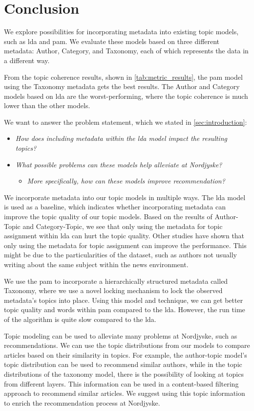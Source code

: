 \section{Conclusion}\label{sec:conclusion}
We explore possibilities for incorporating metadata into existing topic models, such as \gls{lda} and \gls{pam}.
We evaluate these models based on three different metadata: Author, Category, and Taxonomy, each of which represents the data in a different way.

From the topic coherence results, shown in \autoref{tab:metric_results}, the \gls{pam} model using the Taxonomy metadata gets the best results.
The Author and Category models based on \gls{lda} are the worst-performing, where the topic coherence is much lower than the other models.

We want to answer the problem statement, which we stated in \autoref{sec:introduction}:


\begin{itemize}
	\item \textit{How does including metadata within the \gls{lda} model impact the resulting topics?}
	\item \textit{What possible problems can these models help alleviate at Nordjyske?}
	\begin{itemize}
		\item \textit{More specifically, how can these models improve recommendation?}
	\end{itemize}
\end{itemize}

We incorporate metadata into our topic models in multiple ways.
The \gls{lda} model is used as a baseline, which indicates whether incorporating metadata can improve the topic quality of our topic models.
Based on the results of Author-Topic and Category-Topic, we see that only using the metadata for topic assignment within \gls{lda} can hurt the topic quality.
Other studies have shown that only using the metadata for topic assignment can improve the performance.
This might be due to the particularities of the dataset, such as authors not usually writing about the same subject within the news environment.  


We use the \gls{pam} to incorporate a hierarchically structured metadata called Taxonomy, where we use a novel locking mechanism to lock the observed metadata's topics into place.
Using this model and technique, we can get better topic quality and words within \gls{pam} compared to the \gls{lda}.
However, the run time of the algorithm is quite slow compared to the \gls{lda}.


Topic modeling can be used to alleviate many problems at Nordjyske, such as recommendations.
We can use the topic distributions from our models to compare articles based on their similarity in topics.
For example, the author-topic model's topic distribution can be used to recommend similar authors, while in the topic distributions of the taxonomy model, there is the possibility of looking at topics from different layers.
This information can be used in a content-based filtering approach to recommend similar articles.
We suggest using this topic information to enrich the recommendation process at Nordjyske. 

